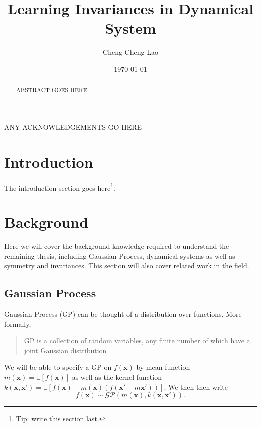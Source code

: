 \documentclass{statsmsc}
\title{Learning Invariances in Dynamical System}
\author{Cheng-Cheng Lao}
\date{\today}
\begin{document}
\maketitle


\declarationdate{\today}
\declaration 


\begin{abstract}
    ABSTRACT GOES HERE
\end{abstract}

\begin{acknowledgements}
    ANY ACKNOWLEDGEMENTS GO HERE
\end{acknowledgements}


\mainmatter


\chapter{Introduction}

The introduction section goes here\footnote{Tip: write this section last.}.

\chapter{Background}
Here we will cover the background knowledge required to understand the remaining thesis, including Gaussian Process, dynamical systems as well as symmetry and invariances. 
This section will also cover related work in the field.


\section{Gaussian Process}
Gaussian Process (GP) can be thought of a distribution over functions. \cite{rasmussen_williams_2006}
More formally, \begin{quote}GP is a collection of random variables, any finite number of which have a joint Gaussian distribution\end{quote}
We will be able to specify a GP on $f(\mathbf{x})$ by mean function $m(\mathbf{x})=\mathbb{E}[f(\mathbf{x})]$ as well as the kernel function $k(\mathbf{x}, \mathbf{x'})=\mathbb{E}[f(\mathbf{x})-m(\mathbf{x})(f(\mathbf{x'}-m{\mathbf{x'}}))]$.
We then then write
$$
f(\mathbf{x})\sim\mathcal{GP}(m(\mathbf{x}),k(\mathbf{x},\mathbf{x'})).
$$
\end{document}
